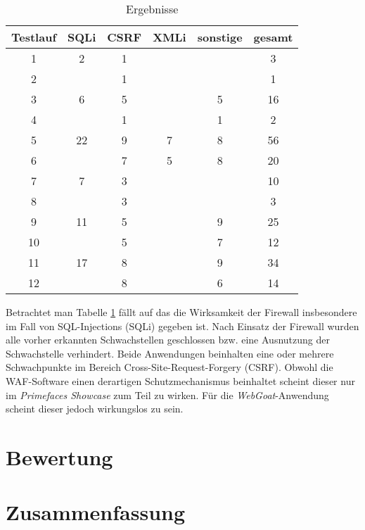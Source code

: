 \begin{table}[h]
    \centering
    \begin{tabular}{cccccc} 
      \toprule
    \textbf{Testlauf} & \textbf{SQLi} & \textbf{CSRF} & \textbf{XMLi} & \textbf{sonstige} & \textbf{gesamt} \\ 
     \midrule
     1 & 2 & 1 &  &  & 3\\
     2 &   & 1 &  &  & 1\\
     3 & 6 & 5 &  & 5 & 16\\
     4 &   & 1 &  & 1  & 2 \\
     5 & 22 & 9 & 7 & 8& 56\\
     6 &  & 7 & 5 & 8 & 20 \\
     7 & 7 & 3 &  &  &  10  \\ 
    8 &  & 3 &  & & 3  \\
    9 & 11 & 5 &  & 9 & 25 \\ 
    10 &   & 5 &  & 7  & 12 \\
    11 & 17 & 8 &  & 9 & 34  \\ 
    12 &  & 8 &  & 6 & 14 \\
   \bottomrule
    \end{tabular}
    \caption{Ergebnisse}
    \label{tab:tes2tergebnisse}
\end{table}

Betrachtet man Tabelle \ref{tab:tes2tergebnisse} fällt auf das die Wirksamkeit der Firewall insbesondere im Fall von SQL-Injections (SQLi) gegeben ist. Nach Einsatz der Firewall wurden alle vorher erkannten Schwachstellen geschlossen bzw. eine Ausnutzung der Schwachstelle verhindert. Beide Anwendungen beinhalten eine oder mehrere Schwachpunkte im Bereich Cross-Site-Request-Forgery (CSRF). Obwohl die WAF-Software einen derartigen Schutzmechanismus beinhaltet scheint dieser nur im \emph{Primefaces Showcase} zum Teil zu wirken. Für die \emph{WebGoat}-Anwendung scheint dieser jedoch wirkungslos zu sein.


\section{Bewertung}





\section{Zusammenfassung}

